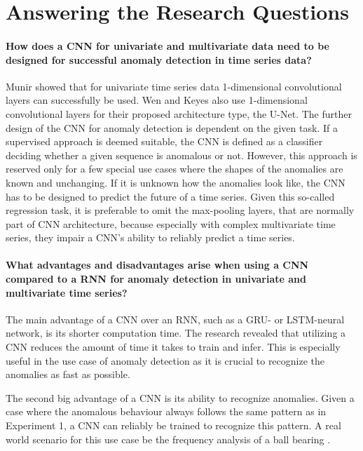 \section{Answering the Research Questions}


\paragraph{How does a CNN for univariate and multivariate data need to be designed for successful anomaly detection in time series data?}

Munir \parencite*{Munir2019} showed that for univariate time series data 1-dimensional convolutional layers can successfully be used. Wen and Keyes \parencite*{Wen2019} also use 1-dimensional convolutional layers for their proposed architecture type, the U-Net. The further design of the CNN for anomaly detection is dependent on the given task. If a supervised approach is deemed suitable, the CNN is defined as a classifier deciding whether a given sequence is anomalous or not. However, this approach is reserved only for a few special use cases where the shapes of the anomalies are known and unchanging. If it is unknown how the anomalies look like, the CNN has to be designed to predict the future of a time series. Given this so-called regression task, it is preferable to omit the max-pooling layers, that are normally part of CNN architecture, because especially with complex multivariate time series, they impair a CNN's ability to reliably predict a time series.  

\paragraph{What advantages and disadvantages arise when using a CNN compared to a RNN for anomaly detection in univariate and multivariate time series?} The main advantage of a CNN over an RNN, such as a GRU- or LSTM-neural network, is its shorter computation time. The research revealed that utilizing a CNN reduces the amount of time it takes to train and infer. This is especially useful in the use case of anomaly detection as it is crucial to recognize the anomalies as fast as possible.

The second big advantage of a CNN is its ability to recognize anomalies. Given a case where the anomalous behaviour always follows the same pattern as in Experiment 1, a CNN can reliably be trained to recognize this pattern. A real world scenario for this use case be the frequency analysis of a ball bearing \parencite{Mais2002}.

